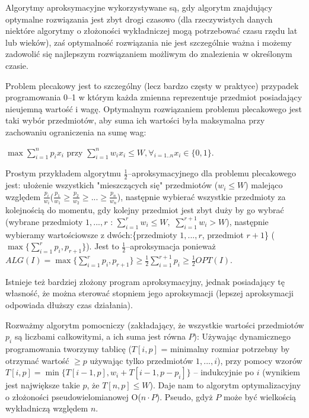 \documentclass[licencjacka]{pracamgr}
\begin{document}
Algorytmy aproksymacyjne wykorzystywane są, gdy algorytm znajdujący optymalne rozwiązania jest zbyt drogi czasowo
(dla rzeczywistych danych niektóre algorytmy o złożoności wykładniczej mogą potrzebować czasu rzędu lat lub wieków),
zaś optymalność rozwiązania nie jest szczególnie ważna i możemy zadowolić się najlepszym rozwiązaniem możliwym do znalezienia w określonym czasie.

Problem plecakowy jest to szczególny (lecz bardzo częsty w praktyce) przypadek programowania 0--1 w którym każda zmienna reprezentuje przedmiot posiadający nieujemną wartość i wagę.
Optymalnym rozwiązaniem problemu plecakowego jest taki wybór przedmiotów, aby suma ich wartości była maksymalna przy zachowaniu ograniczenia na sumę wag:\newline
\centerline{$\max \sum\limits_{i=1}^{n}p_ix_i$ przy $\sum\limits_{i=1}^{n}w_ix_i\le W,\forall_{i=1..n}x_i\in\{0,1\}$.}\newline

Prostym przykładem algorytmu $\frac{1}{2}$--aproksymacyjnego dla problemu plecakowego jest:\newline
ułożenie wszystkich "mieszczących się" przedmiotów ($w_i\le W$) malejąco względem $\frac{p_i}{w_i}$($\frac{p_1}{w_1}\ge\frac{p_2}{w_2}\ge...\ge\frac{p_n}{w_n}$),
następnie wybierać wszystkie przedmioty za kolejnością do momentu, gdy kolejny przedmiot jest zbyt duży by go wybrać
(wybrane przedmioty $1,...,r$ : $\sum\limits_{i=1}^{r}w_i\le W,$ $\sum\limits_{i=1}^{r+1}w_i> W$), następnie wybieramy wartościowsze z dwóch:\{przedmioty $1,...,r$, przedmiot $r+1$\} 
($\max\{\sum\limits_{i=1}^{r}p_i,p_{r+1}\}$).\newline
Jest to $\frac{1}{2}$--aproksymacja ponieważ $ALG(I)=\max\{\sum\limits_{i=1}^{r}p_i,p_{r+1}\}\ge\frac{1}{2}\sum\limits_{i=1}^{r+1}p_i\ge\frac{1}{2}OPT(I)$.

Istnieje też bardziej złożony program aproksymacyjny, jednak posiadający tę własność, że można sterować stopniem jego aproksymacji (lepszej aproksymacji odpowiada dłuższy czas działania).

Rozważmy algorytm pomocniczy (zakładający, że wszystkie wartości przedmiotów $p_i$ są liczbami całkowitymi, a ich suma jest równa $P$):\newline
Używając dynamicznego programowania tworzymy tablicę ($T[i,p]$ = minimalny rozmiar potrzebny by otrzymać wartość $\ge p$ używając tylko przedmiotów $1,...,i$), przy pomocy wzorów
$T[i,p]=\min\{T[i-1,p],w_i+T[i-1,p-p_i]\}$ -- indukcyjnie po $i$ (wynikiem jest największe takie $p$, że $T[n,p]\le W$).
Daje nam to algorytm optymalizacyjny o złożoności pseudowielomianowej O($n\cdot P$). Pseudo, gdyż $P$ może być wielkością wykładniczą względem $n$.
\end{document}
